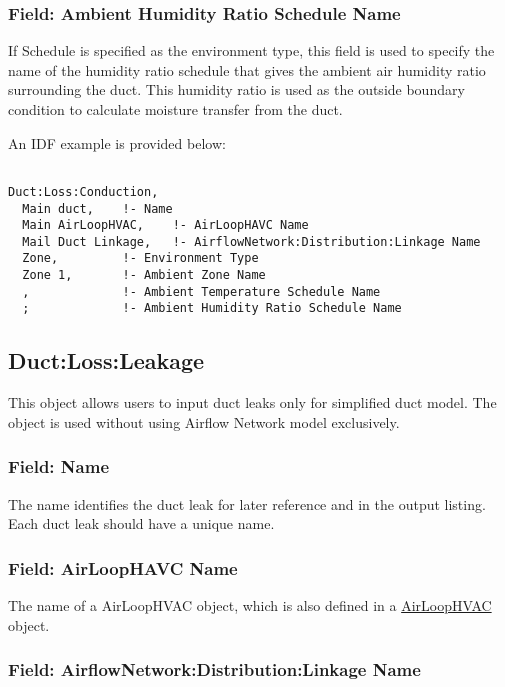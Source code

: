 \subsubsection{Field: Ambient Humidity Ratio Schedule Name}\label{ambienttemperatureschedulename}

If Schedule is specified as the environment type, this field is used to specify the name of the humidity ratio schedule that gives the ambient air humidity ratio surrounding the duct. This humidity ratio is used as the outside boundary condition to calculate moisture transfer from the duct.

An IDF example is provided below:

\begin{lstlisting}

Duct:Loss:Conduction,
  Main duct,    !- Name
  Main AirLoopHVAC,    !- AirLoopHAVC Name
  Mail Duct Linkage,   !- AirflowNetwork:Distribution:Linkage Name
  Zone,         !- Environment Type
  Zone 1,       !- Ambient Zone Name
  ,             !- Ambient Temperature Schedule Name
  ;             !- Ambient Humidity Ratio Schedule Name

\end{lstlisting}

\subsection{Duct:Loss:Leakage}\label{ductlossleakage}

This object allows users to input duct leaks only for simplified duct model. The object is used without using Airflow Network model exclusively. 

\subsubsection{Field: Name}\label{ductloss-field-name-duct-leakage}

The name identifies the duct leak for later reference and in the output listing. Each duct leak should have a unique name.

\subsubsection{Field: AirLoopHAVC Name}\label{airloophavcname}

The name of a AirLoopHVAC object, which is also defined in a \hyperref[airloophvac]{AirLoopHVAC} object.

\subsubsection{Field: AirflowNetwork:Distribution:Linkage Name}\label{duct-leakage-airflownetworkdistributionlinkagename}

